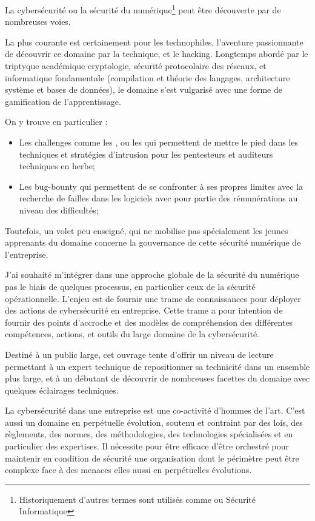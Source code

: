 
La cybersécurité ou la sécurité du numérique\footnote{Historiquement d'autres termes sont utilisés comme   ou  Sécurité Informatique} peut être découverte par de nombreuses voies.

La plus courante est certainement pour les technophiles, l'aventure passionnante de découvrir ce domaine par la technique, et le hacking.  Longtemps abordé par le triptyque académique cryptologie,   sécurité  protocolaire des réseaux, et informatique fondamentale (compilation et théorie des langages, architecture système et bases de données), le domaine s'est vulgarisé avec une forme de gamification de l'apprentissage.

On y trouve en particulier :

\begin{itemize}
  \item Les challenges comme les , ou les  qui permettent de mettre le pied dans les techniques et stratégies d'intrusion pour les pentesteurs et auditeurs techniques en herbe;
  \item Les bug-bounty qui permettent de se confronter à ses propres limites avec la recherche de failles dans les logiciels avec pour partie des rémunérations au niveau des difficultés;
\end{itemize}

Toutefois, un volet peu enseigné, qui ne mobilise pas spécialement les jeunes apprenants du domaine concerne la gouvernance de cette sécurité numérique de l'entreprise.

J'ai souhaité m'intégrer dans  une approche globale de la sécurité du numérique pas le biais de quelques processus, en particulier ceux de la sécurité opérationnelle. L'enjeu est de fournir une trame de connaissances pour déployer des actions de cybersécurité en entreprise.
Cette trame a pour intention de fournir des points d'accroche et des modèles de compréhension des différentes compétences, actions, et outils du large domaine de la cybersécurité.

Destiné à un public large, cet ouvrage tente d'offrir un niveau de lecture permettant à un expert technique de repositionner sa technicité dans un ensemble plus large, et  à un débutant de découvrir de nombreuses facettes du domaine avec quelques éclairages techniques.

La cybersécurité dans une entreprise est une co-activité d'hommes de l'art.  C'est aussi un domaine en perpétuelle évolution, soutenu et contraint par des lois, des règlements, des normes, des méthodologies,  des technologies spécialisées et en particulier des expertises.  Il nécessite pour être efficace d'être orchestré pour maintenir en condition de sécurité une organisation dont le périmètre peut être complexe face à des menaces elles aussi en perpétuelles évolutions.

